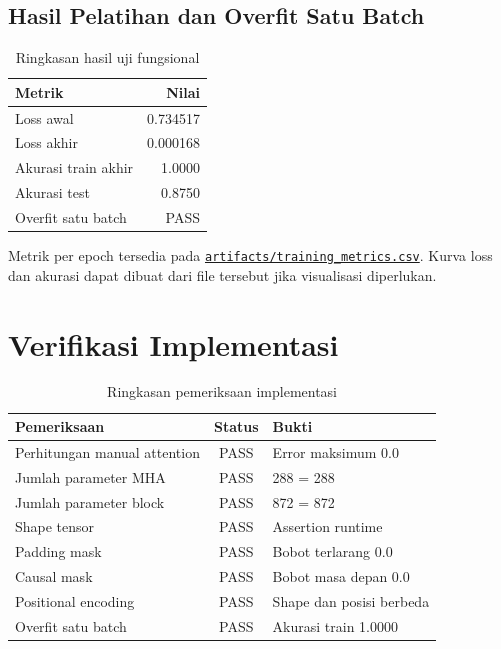 \documentclass[12pt,a4paper]{article}
\newcommand{\metricslink}{\href{https://github.com/Universitas-Cakrawala/tugas-deep-learning-sesi-10/blob/main/artifacts/training_metrics.csv}{\nolinkurl{artifacts/training_metrics.csv}}}
\begin{document}
\subsection{Hasil Pelatihan dan Overfit Satu Batch}
\begin{table}[H]
    \centering
    \caption{Ringkasan hasil uji fungsional}
    \label{tab:functional-test}
    \renewcommand{\arraystretch}{1.2}
    \begin{tabular}{l r}
        \toprule
        Metrik & Nilai \\
        \midrule
        Loss awal & 0.734517 \\
        Loss akhir & 0.000168 \\
        Akurasi train akhir & 1.0000 \\
        Akurasi test & 0.8750 \\
        Overfit satu batch & PASS \\
        \bottomrule
    \end{tabular}
\end{table}

Metrik per epoch tersedia pada \metricslink. Kurva loss dan akurasi dapat dibuat
dari file tersebut jika visualisasi diperlukan.

\section{Verifikasi Implementasi}

\begin{table}[H]
    \centering
    \caption{Ringkasan pemeriksaan implementasi}
    \label{tab:verification-summary}
    \renewcommand{\arraystretch}{1.2}
    \begin{tabular}{l c l}
        \toprule
        Pemeriksaan & Status & Bukti \\
        \midrule
        Perhitungan manual attention & PASS & Error maksimum $0.0$ \\
        Jumlah parameter MHA & PASS & 288 = 288 \\
        Jumlah parameter block & PASS & 872 = 872 \\
        Shape tensor & PASS & Assertion runtime \\
        Padding mask & PASS & Bobot terlarang $0.0$ \\
        Causal mask & PASS & Bobot masa depan $0.0$ \\
        Positional encoding & PASS & Shape dan posisi berbeda \\
        Overfit satu batch & PASS & Akurasi train 1.0000 \\
        \bottomrule
    \end{tabular}
\end{table}
\end{document}
